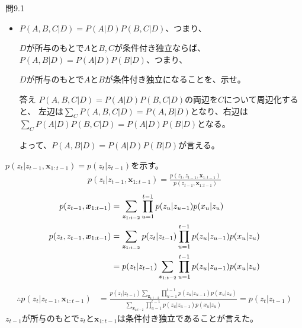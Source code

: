 \documentclass[aspectratio=169,unicode,dvipdfmx,14pt]{beamer}
\begin{document}
\begin{frame}{問9.1}
\begin{itemize}
\item $P(A,B,C|D)=P(A|D)P(B,C|D)$、つまり、
\item[] $D$が所与のもとで$A$と$B,C$が条件付き独立ならば、
$P(A,B|D)=P(A|D)P(B|D)$、つまり、
\item[] $D$が所与のもとで$A$と$B$が条件付き独立になることを、示せ。
\item[答え] $P(A,B,C|D)=P(A|D)P(B,C|D)$の両辺を$C$について周辺化すると、
左辺は$\sum_C P(A,B,C|D)=P(A,B|D)$となり、右辺は$\sum_C  P(A|D)P(B,C|D)=P(A|D)P(B|D)$となる。
\item[] よって、$P(A,B|D) = P(A|D)P(B|D)$が言える。
\end{itemize}
\end{frame}


\begin{frame}{}
\FontMath
$p(z_t|z_{t-1},\bm{x}_{1:t-1}) = p(z_t|z_{t-1})$を示す。
\begin{align}
p(z_t|z_{t-1},\bm{x}_{1:t-1}) = \frac{p(z_t,z_{t-1},\bm{x}_{1:t-1})}{p(z_{t-1},\bm{x}_{1:t-1})}
\end{align}
\begin{align}
p(z_{t-1},\bm{x}_{1:t-1}) & = \sum_{\bm{z}_{1:t-2}} \prod_{u=1}^{t-1} p(z_u|z_{u-1})p(x_u|z_u)
\\
p(z_t,z_{t-1},\bm{x}_{1:t-1}) & = \sum_{\bm{z}_{1:t-2}} p(z_t|z_{t-1}) \prod_{u=1}^{t-1} p(z_u|z_{u-1})p(x_u|z_u)
\notag \\ &
= p(z_t|z_{t-1}) \sum_{\bm{z}_{1:t-2}} \prod_{u=1}^{t-1} p(z_u|z_{u-1})p(x_u|z_u)
\label{eq:eq01}
\end{align}
\begin{align}
\therefore
p(z_t|z_{t-1},\bm{x}_{1:t-1}) & = \frac{p(z_t|z_{t-1})  \sum_{\bm{z}_{1:t-2}} \prod_{u=1}^{t-1} p(z_u|z_{u-1})p(x_u|z_u)
}{\sum_{\bm{z}_{1:t-2}} \prod_{u=1}^{t-1} p(z_u|z_{u-1})p(x_u|z_u)
}
 = p(z_t|z_{t-1}) 
\end{align}
$z_{t-1}$が所与のもとで$z_t$と$\bm{x}_{1:t-1}$は条件付き独立であることが言えた。
\end{frame}
\end{document}
